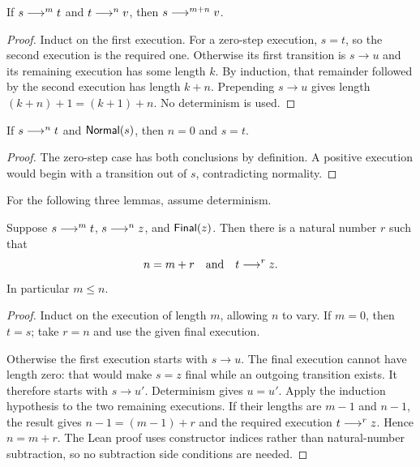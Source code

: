 \begin{lemma}[Concatenation]
If $s\mathrel{\longrightarrow^{m}}t$ and $t\mathrel{\longrightarrow^{n}}v$, then $s\mathrel{\longrightarrow^{m+n}}v$.
\end{lemma}
\begin{proof}
Induct on the first execution. For a zero-step execution, $s=t$, so the second
execution is the required one. Otherwise its first transition is $s\to u$
and its remaining execution has some length $k$. By induction, that remainder
followed by the second execution has length $k+n$. Prepending $s\to u$
gives length $(k+n)+1=(k+1)+n$. No determinism is used.
\end{proof}

\begin{lemma}
If $s\mathrel{\longrightarrow^{n}}t$ and $\mathsf{Normal}(s)$, then $n=0$ and $s=t$.
\end{lemma}
\begin{proof}
The zero-step case has both conclusions by definition. A positive execution
would begin with a transition out of $s$, contradicting normality.
\end{proof}

For the following three lemmas, assume determinism.

\begin{lemma}
Suppose $s\mathrel{\longrightarrow^{m}}t$, $s\mathrel{\longrightarrow^{n}}z$, and $\mathsf{Final}(z)$. Then there is a
natural number $r$ such that
\[
 n=m+r\quad\text{and}\quad t\mathrel{\longrightarrow^{r}}z.
\]
In particular $m\leq n$.
\end{lemma}
\begin{proof}
Induct on the execution of length $m$, allowing $n$ to vary. If $m=0$, then
$t=s$; take $r=n$ and use the given final execution.

Otherwise the first execution starts with $s\to u$. The final execution
cannot have length zero: that would make $s=z$ final while an outgoing
transition exists. It therefore starts with $s\to u'$. Determinism gives
$u=u'$. Apply the induction hypothesis to the two remaining executions. If
their lengths are $m-1$ and $n-1$, the result gives
$n-1=(m-1)+r$ and the required execution $t\mathrel{\longrightarrow^{r}}z$. Hence $n=m+r$.
The Lean proof uses constructor indices rather than natural-number
subtraction, so no subtraction side conditions are needed.
\end{proof}

